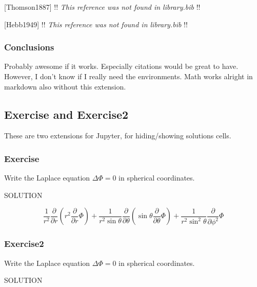 {[}Thomson1887{]} !! \emph{This reference was not found in library.bib }
!!

{[}Hebb1949{]} !! \emph{This reference was not found in library.bib } !!

    \subsubsection{Conclusions}\label{conclusions}

Probably awesome if it works. Especially citations would be great to
have. However, I don't know if I really need the environments. Math
works alright in markdown also without this extension.

    \subsection{Exercise and Exercise2}\label{exercise-and-exercise2}

These are two extensions for Jupyter, for hiding/showing solutions
cells.

\subsubsection{Exercise}\label{exercise}

\begin{exercise} Write the Laplace
equation \(\Delta\Phi=0\) in spherical coordinates.
\end{exercise}

    SOLUTION

    \begin{equation}
\frac{1}{r^2}\frac{\partial}{\partial r} \left( r^2 \frac{\partial}{\partial r} \Phi \right) + \frac{1}{r^2 \sin\theta}\frac{\partial}{\partial \theta} \left( \sin\theta \frac{\partial}{\partial \theta} \Phi \right) + \frac{1}{r^2 \sin^2\theta}\frac{\partial}{\partial \phi^2} \Phi
\end{equation}

    \subsubsection{Exercise2}\label{exercise2}

\begin{exercise} Write the Laplace
equation \(\Delta\Phi=0\) in spherical coordinates.
\end{exercise}

    SOLUTION

